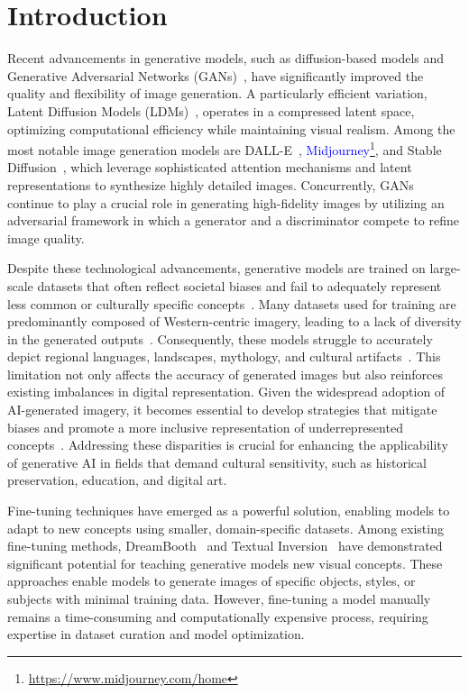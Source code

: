 \documentclass[pdflatex,sn-mathphys-num]{sn-jnl}%
\theoremstyle{thmstyleone}%
\theoremstyle{thmstyletwo}%
\theoremstyle{thmstylethree}%
\begin{document}
\section{Introduction}\label{sec1}

Recent advancements in generative models, such as diffusion-based models and Generative Adversarial Networks (GANs)~\cite{goodfellow2014generativeadversarialnetworks}, have significantly improved the quality and flexibility of image generation. A particularly efficient variation, Latent Diffusion Models (LDMs)~\cite{rombach2022high}, operates in a compressed latent space, optimizing computational efficiency while maintaining visual realism. Among the most notable image generation models are DALL-E~\cite{betker2023improving}, \textcolor{blue}{Midjourney}\footnote{\url{https://www.midjourney.com/home}}, and Stable Diffusion~\cite{rombach2022high}, which leverage sophisticated attention mechanisms and latent representations to synthesize highly detailed images. Concurrently, GANs~\cite{goodfellow2016deep} continue to play a crucial role in generating high-fidelity images by utilizing an adversarial framework in which a generator and a discriminator compete to refine image quality.  

Despite these technological advancements, generative models are trained on large-scale datasets that often reflect societal biases and fail to adequately represent less common or culturally specific concepts~\cite{navigli2023biases}. Many datasets used for training are predominantly composed of Western-centric imagery, leading to a lack of diversity in the generated outputs~\cite{NEURIPS2024_18c669b8}. Consequently, these models struggle to accurately depict regional languages, landscapes, mythology, and cultural artifacts~\cite{pampas}. This limitation not only affects the accuracy of generated images but also reinforces existing imbalances in digital representation.  Given the widespread adoption of AI-generated imagery, it becomes essential to develop strategies that mitigate biases and promote a more inclusive representation of underrepresented concepts~\cite{sci6010003}. Addressing these disparities is crucial for enhancing the applicability of generative AI in fields that demand cultural sensitivity, such as historical preservation, education, and digital art. 

Fine-tuning techniques have emerged as a powerful solution, enabling models to adapt to new concepts using smaller, domain-specific datasets. Among existing fine-tuning methods, DreamBooth~\cite{dreambooth} and Textual Inversion~\cite{textualinversion} have demonstrated significant potential for teaching generative models new visual concepts. These approaches enable models to generate images of specific objects, styles, or subjects with minimal training data. However, fine-tuning a model manually remains a time-consuming and computationally expensive process, requiring expertise in dataset curation and model optimization.  
\end{document}
